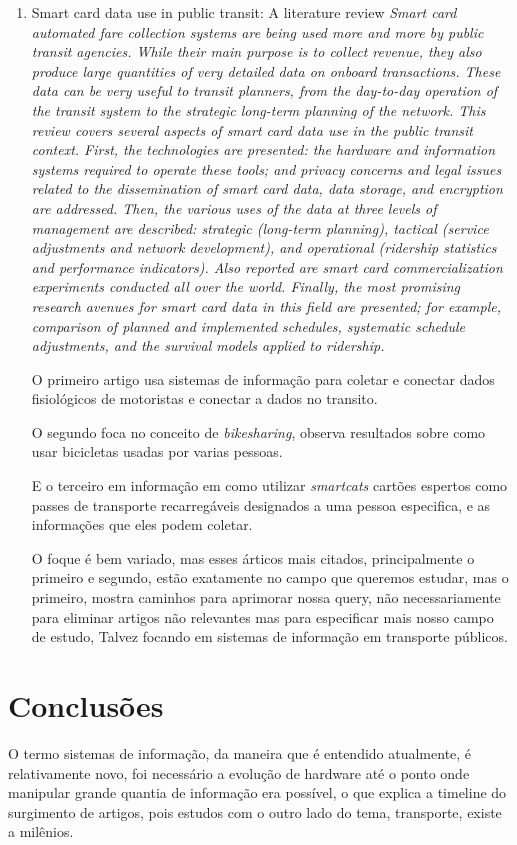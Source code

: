 \begin{enumerate}
\item Smart card data use in public transit: A literature review
\small\textit{Smart card automated fare collection systems are being used more and more by public transit agencies. While their main purpose is to collect revenue, they also produce large quantities of very detailed data on onboard transactions. These data can be very useful to transit planners, from the day-to-day operation of the transit system to the strategic long-term planning of the network. This review covers several aspects of smart card data use in the public transit context. First, the technologies are presented: the hardware and information systems required to operate these tools; and privacy concerns and legal issues related to the dissemination of smart card data, data storage, and encryption are addressed. Then, the various uses of the data at three levels of management are described: strategic (long-term planning), tactical (service adjustments and network development), and operational (ridership statistics and performance indicators). Also reported are smart card commercialization experiments conducted all over the world. Finally, the most promising research avenues for smart card data in this field are presented; for example, comparison of planned and implemented schedules, systematic schedule adjustments, and the survival models applied to ridership.}


O primeiro artigo usa sistemas de informação para coletar e conectar dados fisiológicos de motoristas e conectar a dados no transito.

O segundo foca no conceito de \textit{bikesharing}, observa resultados sobre como usar bicicletas usadas por varias pessoas.

E o terceiro em informação em como utilizar \textit{smartcats} cartões espertos como passes de transporte recarregáveis designados a uma pessoa especifica, e as informações que eles podem coletar.

O foque é bem variado, mas esses árticos mais citados, principalmente o primeiro e segundo, estão exatamente no campo que queremos estudar, mas o primeiro, mostra caminhos para aprimorar nossa query, não necessariamente para eliminar artigos não relevantes mas para especificar mais nosso campo de estudo, Talvez focando em sistemas de informação em transporte públicos.
\end{enumerate}
\section{Conclusões}
O termo sistemas de informação, da maneira que é entendido atualmente, é relativamente novo, foi necessário a evolução de hardware até o ponto onde manipular grande quantia de informação era possível, o que explica a timeline do surgimento de artigos, pois estudos com o outro lado do tema, transporte, existe a milênios.

